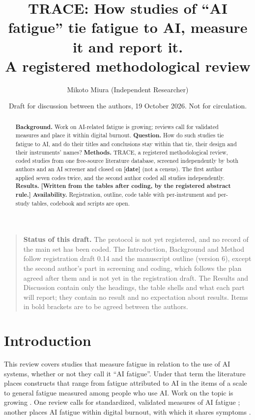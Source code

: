 \documentclass[11pt]{article}
\title{TRACE: How studies of ``AI fatigue'' tie fatigue to AI, measure it and report it.\\
A registered methodological review}
\author{Mikoto Miura (Independent Researcher) \and \tbd{Author 2: name, affiliation}}
\date{Draft for discussion between the authors, 19 October 2026. Not for circulation.}
\newcommand{\tbd}[1]{\textbf{[#1]}}
\begin{document}
\maketitle

\begin{quote}\small
\textbf{Status of this draft.} The protocol is not yet registered, and no record of the main set has been coded. The
Introduction, Background and Method follow registration draft 0.14 and the manuscript outline (version 6), except
the second author's part in screening and coding, which follows the plan agreed after them and is not yet in the
registration draft. The Results
and Discussion contain only the headings, the table shells and what each part will report; they contain no result and
no expectation about results. Items in bold brackets are to be agreed between the authors.
\end{quote}

\begin{abstract}
\noindent\textbf{Background.} Work on AI-related fatigue is growing; reviews call for validated measures and place it
within digital burnout.
\textbf{Question.} How do such studies tie fatigue to AI, and do their titles and conclusions stay within that tie,
their design and their instruments' names?
\textbf{Methods.} TRACE, a registered methodological review, coded studies from one free-source literature database,
screened independently by both authors and an AI screener and closed on \tbd{date} (not a census). The first author
applied seven codes twice, and the second author coded all studies independently.
\textbf{Results.} \tbd{Written from the tables after coding, by the registered abstract rule.}
\textbf{Availability.} Registration, outline, code table with per-instrument and per-study tables, codebook and scripts
are open.
\end{abstract}

\section{Introduction}

This review covers studies that measure fatigue in relation to the use of AI systems, whether or not they call it
``AI fatigue''. Under that term the literature places constructs that range from fatigue attributed to AI in the items
of a scale to general fatigue measured among people who use AI. Work on the topic is growing
\citep{ragolane2025}. One review calls for standardized, validated measures of AI fatigue \citep{sosinski2026};
another places AI fatigue within digital burnout, with which it shares symptoms \citep{ragolane2025}.
\end{document}

